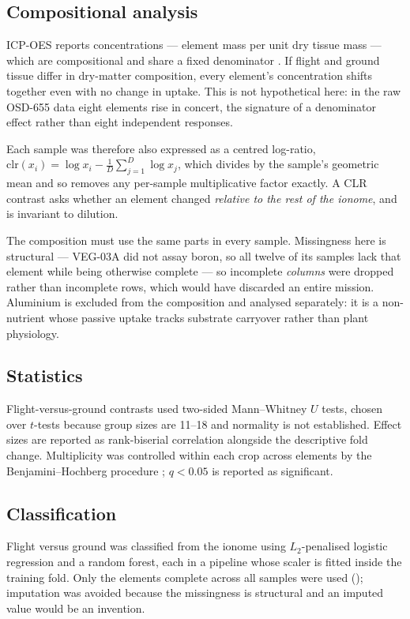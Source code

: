 \subsection{Compositional analysis}
\label{sec:clr}

ICP-OES reports concentrations --- element mass per unit dry tissue mass ---
which are compositional and share a fixed denominator \citep{aitchison1982}. If
flight and ground tissue differ in dry-matter composition, every element's
concentration shifts together even with no change in uptake. This is not
hypothetical here: in the raw OSD-655 data eight elements rise in concert, the
signature of a denominator effect rather than eight independent responses.

Each sample was therefore also expressed as a centred log-ratio,
$\mathrm{clr}(x_i) = \log x_i - \frac{1}{D}\sum_{j=1}^{D} \log x_j$, which
divides by the sample's geometric mean and so removes any per-sample
multiplicative factor exactly. A CLR contrast asks whether an element changed
\emph{relative to the rest of the ionome}, and is invariant to dilution.

The composition must use the same parts in every sample. Missingness here is
structural --- VEG-03A did not assay boron, so all twelve of its samples lack
that element while being otherwise complete --- so incomplete \emph{columns}
were dropped rather than incomplete rows, which would have discarded an entire
mission. Aluminium is excluded from the composition and analysed separately: it
is a non-nutrient whose passive uptake tracks substrate carryover rather than
plant physiology.

\subsection{Statistics}

Flight-versus-ground contrasts used two-sided Mann--Whitney $U$ tests, chosen
over $t$-tests because group sizes are 11--18 and normality is not established.
Effect sizes are reported as rank-biserial correlation alongside the descriptive
fold change. Multiplicity was controlled within each crop across elements by the
Benjamini--Hochberg procedure \citep{benjamini1995}; $q<0.05$ is reported as
significant.

\subsection{Classification}

Flight versus ground was classified from the ionome using $L_2$-penalised
logistic regression and a random forest, each in a pipeline whose scaler is
fitted inside the training fold. Only the \MLNFeatures{} elements complete
across all \NSamples{} samples were used (\MLFeatures); imputation was avoided
because the missingness is structural and an imputed value would be an
invention.

